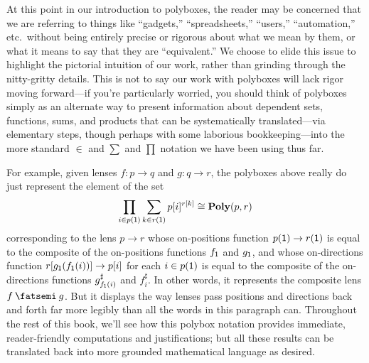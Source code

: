 \documentclass[Book-Poly]{subfiles}
\begin{document}
\begin{remark}
At this point in our introduction to polyboxes, the reader may be concerned that we are referring to things like ``gadgets,'' ``spreadsheets,'' ``users,'' ``automation,'' etc.\ without being entirely precise or rigorous about what we mean by them, or what it means to say that they are ``equivalent.''
We choose to elide this issue to highlight the pictorial intuition of our work, rather than grinding through the nitty-gritty details.
This is not to say our work with polyboxes will lack rigor moving forward---if you're particularly worried, you should think of polyboxes simply as an alternate way to present information about dependent sets, functions, sums, and products that can be systematically translated---via elementary steps, though perhaps with some laborious bookkeeping---into the more standard $\in$ and $\sum$ and $\prod$ notation we have been using thus far.

For example, given lenses $f\colon p\to q$ and $g\colon q\to r$, the polyboxes above really do just represent the element of the set
\[
    \prod_{i\in p(\textsf{1})}\sum_{k\in r(\textsf{1})}p[i]^{r[k]}\cong\mathbf{Poly}(p,r)
\]
corresponding to the lens $p\to r$ whose on-positions function $p(\textsf{1})\to r(\textsf{1})$ is equal to the composite of the on-positions functions $f_{\textsf{1}}$ and $g_{\textsf{1}}$, and whose on-directions function $r[g_{\textsf{1}}(f_{\textsf{1}}(i))]\to p[i]$ for each $i\in p(\textsf{1})$ is equal to the composite of the on-directions functions $g^\sharp_{f_{\textsf{1}}(i)}$ and $f^\sharp_i$.
In other words, it represents the composite lens $f\then g$.
But it displays the way lenses pass positions and directions back and forth far more legibly than all the words in this paragraph can.
Throughout the rest of this book, we'll see how this polybox notation provides immediate, reader-friendly computations and justifications; but all these results can be translated back into more grounded mathematical language as desired.
\end{remark}
\end{document}
